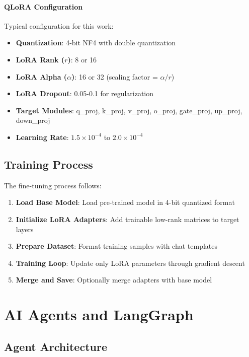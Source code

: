 \paragraph{QLoRA Configuration}

Typical configuration for this work:

\begin{itemize}[leftmargin=1.2em]
  \item \textbf{Quantization}: 4-bit NF4 with double quantization
  \item \textbf{LoRA Rank ($r$)}: 8 or 16
  \item \textbf{LoRA Alpha ($\alpha$)}: 16 or 32 (scaling factor = $\alpha / r$)
  \item \textbf{LoRA Dropout}: 0.05-0.1 for regularization
  \item \textbf{Target Modules}: q\_proj, k\_proj, v\_proj, o\_proj, gate\_proj, up\_proj, down\_proj
  \item \textbf{Learning Rate}: $1.5 \times 10^{-4}$ to $2.0 \times 10^{-4}$
\end{itemize}

\subsection{Training Process}

The fine-tuning process follows:

\begin{enumerate}[leftmargin=1.2em]
  \item \textbf{Load Base Model}: Load pre-trained model in 4-bit quantized format
  \item \textbf{Initialize LoRA Adapters}: Add trainable low-rank matrices to target layers
  \item \textbf{Prepare Dataset}: Format training samples with chat templates
  \item \textbf{Training Loop}: Update only LoRA parameters through gradient descent
  \item \textbf{Merge and Save}: Optionally merge adapters with base model
\end{enumerate}

\section{AI Agents and LangGraph}

\subsection{Agent Architecture}

